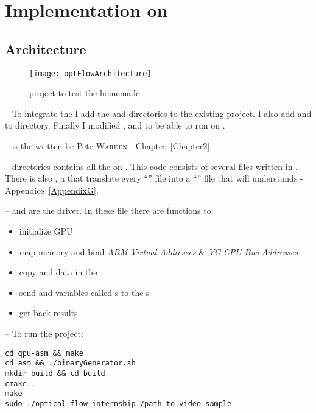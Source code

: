 \section{Implementation on \vc}

\subsection{Architecture}

\begin{figure}[!htbp]
	\centering
	\texttt{[image: optFlowArchitecture]}
\caption{ project to test the homemade \api}
	\label{optFlowFig}
\end{figure}
\FloatBarrier

-- To integrate the \api{} I add the  and  directories to the existing  project. I also add  and  to  directory. Finally I modified ,  and  to be able to run \flow{}  on \vc.

--  is the  written be Pete \textsc{Warden} - Chapter~\ref{Chapter2}.

--  directories contains all the  on \vc. This code consists of several  files written in .\\
There is also , a  that translate every \enquote{} file into a \enquote{} file that \vc{} will understands - Appendice~\ref{AppendixG}.

--  and  are the  driver. In these file there are functions to:
\begin{itemize}
	\item initialize GPU
	\item map \ram{} memory and bind \emph{ARM Virtual Addresses} \& \emph{VC CPU Bus Addresses}
	\item copy  and data in the \ram
	\item send   and variables called \uni{}s to the \qpu{}s
	\item get back results
\end{itemize}


-- To run the project:
\begin{lstlisting}
cd qpu-asm && make
cd asm && ./binaryGenerator.sh
mkdir build && cd build
cmake..
make
sudo ./optical_flow_internship /path_to_video_sample
\end{lstlisting}


